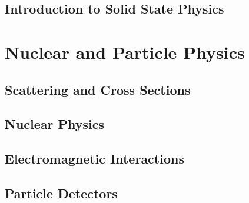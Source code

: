 \documentclass[a4paper, 11pt]{book}
\newcommand{\1}{\opr{\mathds{1}}}
\theoremstyle{definition}
\theoremstyle{remark}
\begin{document}
	\chapter{Introduction to Solid State Physics}
		
%		
%		
%		
%		
%		
\part{Nuclear and Particle Physics}
	\chapter{Scattering and Cross Sections}
	
	\chapter{Nuclear Physics}
	
	\chapter{Electromagnetic Interactions}
	
	\chapter{Particle Detectors}
	
\end{document}
